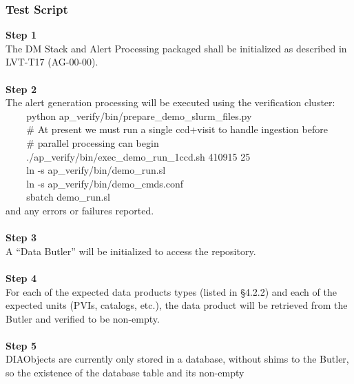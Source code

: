 \hypertarget{test-script-126}{%
\subsubsection{Test Script}\label{test-script-126}}

\textbf{Step 1}\\
The DM Stack and Alert Processing packaged shall be initialized as
described in LVT-T17 (AG-00-00).\\
~\\
\textbf{Step 2}\\
The alert generation processing will be executed using the verification
cluster:\\
\hspace*{0.333em} ~ ~ ~python
ap\_verify/bin/prepare\_demo\_slurm\_files.py\\
\hspace*{0.333em} ~ ~ ~\# At present we must run a single ccd+visit to
handle ingestion before\\
\hspace*{0.333em} ~ ~ ~\# parallel processing can begin\\
\hspace*{0.333em} ~ ~ ~./ap\_verify/bin/exec\_demo\_run\_1ccd.sh 410915
25\\
\hspace*{0.333em} ~ ~ ~ln -s ap\_verify/bin/demo\_run.sl\\
\hspace*{0.333em} ~ ~ ~ln -s ap\_verify/bin/demo\_cmds.conf\\
\hspace*{0.333em} ~ ~ ~sbatch demo\_run.sl\\
and any errors or failures reported.\\
~\\
\textbf{Step 3}\\
A ``Data Butler'' will be initialized to access the repository.\\
~\\
\textbf{Step 4}\\
For each of the expected data products types (listed in §4.2.2) and each
of the expected units (PVIs, catalogs, etc.), the data product will be
retrieved from the Butler and verified to be non-empty.\\
~\\
\textbf{Step 5}\\
DIAObjects are currently only stored in a database, without shims to the
Butler, so the existence of the database table and its non-empty

